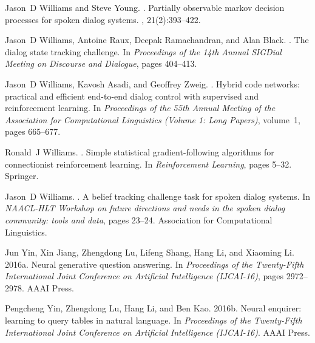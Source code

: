 \documentclass[11pt]{article}
\begin{document}
\begin{thebibliography}{}
	Jason~D Williams and Steve Young.
	.
	\newblock Partially observable markov decision processes for spoken dialog
	systems.
	, 21(2):393--422.
	
	Jason~D Williams, Antoine Raux, Deepak Ramachandran, and Alan Black.
	.
	\newblock The dialog state tracking challenge.
	\newblock In {\em Proceedings of the 14th Annual SIGDial Meeting on Discourse
		and Dialogue}, pages 404--413.
	
	Jason~D Williams, Kavosh Asadi, and Geoffrey Zweig.
	.
	\newblock Hybrid code networks: practical and efficient end-to-end dialog
	control with supervised and reinforcement learning.
	\newblock In {\em Proceedings of the 55th Annual Meeting of the Association for
		Computational Linguistics (Volume 1: Long Papers)}, volume~1, pages 665--677.
	
	Ronald~J Williams.
	.
	\newblock Simple statistical gradient-following algorithms for connectionist
	reinforcement learning.
	\newblock In {\em Reinforcement Learning}, pages 5--32. Springer.
	
	Jason~D Williams.
	.
	\newblock A belief tracking challenge task for spoken dialog systems.
	\newblock In {\em NAACL-HLT Workshop on future directions and needs in the
		spoken dialog community: tools and data}, pages 23--24. Association for
	Computational Linguistics.
	
	Jun Yin, Xin Jiang, Zhengdong Lu, Lifeng Shang, Hang Li, and Xiaoming Li.
	\newblock 2016a.
	\newblock Neural generative question answering.
	\newblock In {\em Proceedings of the Twenty-Fifth International Joint
		Conference on Artificial Intelligence (IJCAI-16)}, pages 2972--2978. AAAI
	Press.
	
	Pengcheng Yin, Zhengdong Lu, Hang Li, and Ben Kao.
	\newblock 2016b.
	\newblock Neural enquirer: learning to query tables in natural language.
	\newblock In {\em Proceedings of the Twenty-Fifth International Joint
		Conference on Artificial Intelligence (IJCAI-16)}. AAAI Press.
	

\end{thebibliography}
\end{document}
